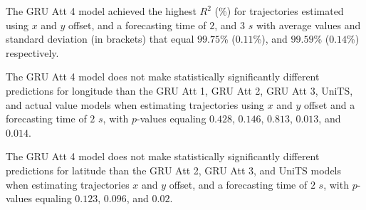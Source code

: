 \begin{table}[!ht]
	\centering
	\caption{The average $R^{2}$ (\%), with standard deviation in brackets, across k-fold validation datasets for the trajectories in the k-fold testing datasets estimated using $x$ and $y$ offset, different RNN models, and forecasting times.}
	\label{tab:best_no_abs_R2}
\end{table}

The GRU Att 4 model achieved the highest $R^{2}$ (\%) for trajectories estimated using $x$ and $y$ offset, and a forecasting time of $2$, and $3$ $s$ with average values and standard deviation (in brackets) that equal $99.75$\% ($0.11$\%), and $99.59$\% ($0.14$\%) respectively.

The GRU Att 4 model does not make statistically significantly different predictions for longitude than the GRU Att 1, GRU Att 2, GRU Att 3, UniTS, and actual value models when estimating trajectories using $x$ and $y$ offset and a forecasting time of $2$ $s$, with $p$-values equaling $0.428$, $0.146$, $0.813$, $0.013$, and $0.014$.


The GRU Att 4 model does not make statistically significantly different predictions for latitude than the GRU Att 2, GRU Att 3, and UniTS models when estimating trajectories $x$ and $y$ offset, and a forecasting time of $2$ $s$, with $p$-values equaling $0.123$, $0.096$, and $0.02$.

